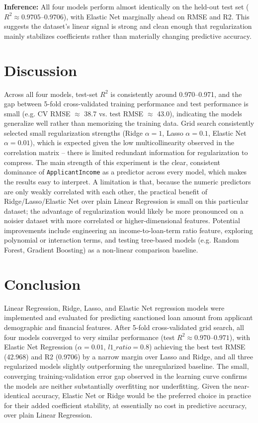 \documentclass[12pt,a4paper]{article}
\begin{document}
\textbf{Inference:} All four models perform almost identically on the held-out test set
($R^2 \approx 0.9705$--$0.9706$), with Elastic Net marginally ahead on RMSE and R2. This suggests
the dataset's linear signal is strong and clean enough that regularization mainly stabilizes
coefficients rather than materially changing predictive accuracy.

\section{Discussion}

Across all four models, test-set $R^2$ is consistently around 0.970--0.971, and the gap between
5-fold cross-validated training performance and test performance is small (e.g. CV RMSE
$\approx$ 38.7 vs. test RMSE $\approx$ 43.0), indicating the models generalize well rather than
memorizing the training data. Grid search consistently selected small regularization strengths
(Ridge $\alpha=1$, Lasso $\alpha=0.1$, Elastic Net $\alpha=0.01$), which is expected given the low
multicollinearity observed in the correlation matrix -- there is limited redundant information for
regularization to compress. The main strength of this experiment is the clear, consistent
dominance of \texttt{ApplicantIncome} as a predictor across every model, which makes the results
easy to interpret. A limitation is that, because the numeric predictors are only weakly correlated
with each other, the practical benefit of Ridge/Lasso/Elastic Net over plain Linear Regression is
small on this particular dataset; the advantage of regularization would likely be more pronounced
on a noisier dataset with more correlated or higher-dimensional features. Potential improvements
include engineering an income-to-loan-term ratio feature, exploring polynomial or interaction
terms, and testing tree-based models (e.g. Random Forest, Gradient Boosting) as a non-linear
comparison baseline.

\section{Conclusion}

Linear Regression, Ridge, Lasso, and Elastic Net regression models were implemented and evaluated
for predicting sanctioned loan amount from applicant demographic and financial features. After
5-fold cross-validated grid search, all four models converged to very similar performance (test
$R^2 \approx 0.970$--$0.971$), with Elastic Net Regression ($\alpha=0.01$, $l1\_ratio=0.8$)
achieving the best test RMSE (42.968) and R2 (0.9706) by a narrow margin over Lasso and Ridge, and
all three regularized models slightly outperforming the unregularized baseline. The small,
converging training-validation error gap observed in the learning curve confirms the models are
neither substantially overfitting nor underfitting. Given the near-identical accuracy, Elastic Net
or Ridge would be the preferred choice in practice for their added coefficient stability, at
essentially no cost in predictive accuracy, over plain Linear Regression.
\end{document}
